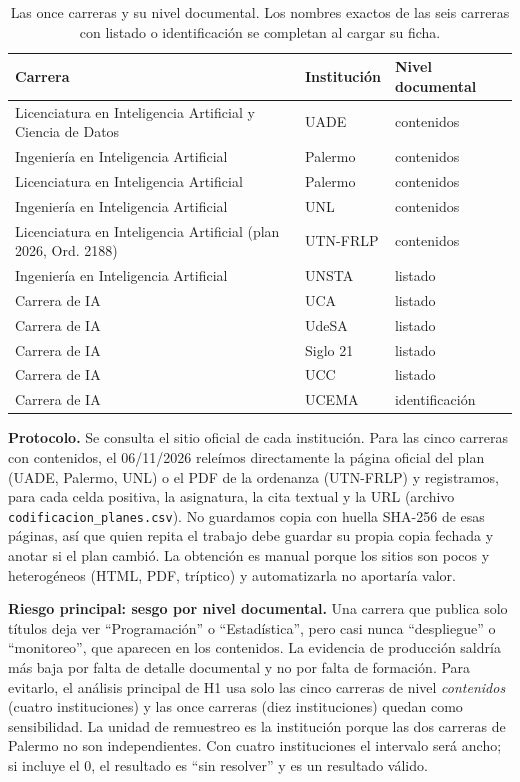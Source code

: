\documentclass[11pt,a4paper]{article}
\begin{document}
\begin{table}[H]
\centering\small
\begin{tabular}{L{7.0cm} L{2.6cm} L{3.4cm}}
\toprule
{}\textbf{Carrera} & \textbf{Institución} & \textbf{Nivel documental}\\
\midrule
Licenciatura en Inteligencia Artificial y Ciencia de Datos & UADE & contenidos\\
Ingeniería en Inteligencia Artificial & Palermo & contenidos\\
Licenciatura en Inteligencia Artificial & Palermo & contenidos\\
Ingeniería en Inteligencia Artificial & UNL & contenidos\\
Licenciatura en Inteligencia Artificial (plan 2026, Ord. 2188) & UTN-FRLP & contenidos\\
Ingeniería en Inteligencia Artificial & UNSTA & listado\\
Carrera de IA & UCA & listado\\
Carrera de IA & UdeSA & listado\\
Carrera de IA & Siglo 21 & listado\\
Carrera de IA & UCC & listado\\
Carrera de IA & UCEMA & identificación\\
\bottomrule
\end{tabular}
\caption{Las once carreras y su nivel documental. Los nombres exactos de las seis carreras con listado o identificación se completan al cargar su ficha.}
\end{table}

\textbf{Protocolo.} Se consulta el sitio oficial de cada institución. Para las cinco carreras con contenidos, el 06/11/2026 releímos directamente la página oficial del plan (UADE, Palermo, UNL) o el PDF de la ordenanza (UTN-FRLP) y registramos, para cada celda positiva, la asignatura, la cita textual y la URL (archivo \texttt{codificacion\_planes.csv}). No guardamos copia con huella SHA-256 de esas páginas, así que quien repita el trabajo debe guardar su propia copia fechada y anotar si el plan cambió. La obtención es manual porque los sitios son pocos y heterogéneos (HTML, PDF, tríptico) y automatizarla no aportaría valor.

\begin{caja}
\textbf{Riesgo principal: sesgo por nivel documental.} Una carrera que publica solo títulos deja ver ``Programación'' o ``Estadística'', pero casi nunca ``despliegue'' o ``monitoreo'', que aparecen en los contenidos. La evidencia de producción saldría más baja por falta de detalle documental y no por falta de formación. Para evitarlo, el análisis principal de H1 usa solo las cinco carreras de nivel \emph{contenidos} (cuatro instituciones) y las once carreras (diez instituciones) quedan como sensibilidad. La unidad de remuestreo es la institución porque las dos carreras de Palermo no son independientes. Con cuatro instituciones el intervalo será ancho; si incluye el 0, el resultado es ``sin resolver'' y es un resultado válido.
\end{caja}
\end{document}
